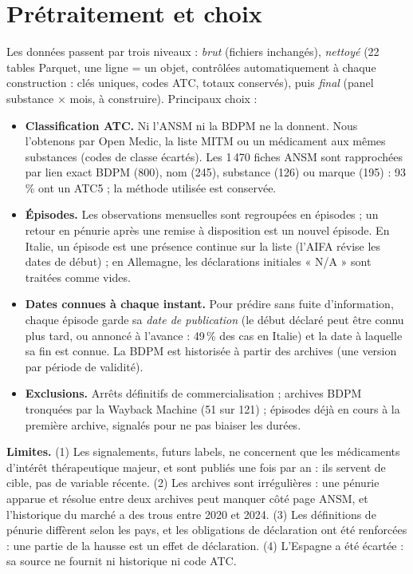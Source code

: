 \documentclass[10pt,a4paper]{article}
\newcommand{\nb}[1]{\textbf{#1}}
\begin{document}
\section{Prétraitement et choix}

Les données passent par trois niveaux : \emph{brut} (fichiers inchangés), \emph{nettoyé} (22 tables Parquet, une ligne =
un objet, contrôlées automatiquement à chaque construction : clés uniques, codes ATC, totaux conservés), puis \emph{final}
(panel substance × mois, à construire). Principaux choix :

\begin{itemize}
  \item \nb{Classification ATC.} Ni l'ANSM ni la BDPM ne la donnent. Nous l'obtenons par Open Medic, la liste MITM ou un
  médicament aux mêmes substances (codes de classe écartés). Les 1\,470 fiches ANSM sont rapprochées par lien exact BDPM (800),
  nom (245), substance (126) ou marque (195) : 93\,\% ont un ATC5 ; la méthode utilisée est conservée.
  \item \nb{Épisodes.} Les observations mensuelles sont regroupées en épisodes ; un retour en pénurie après une remise à
  disposition est un nouvel épisode. En Italie, un épisode est une présence continue sur la liste (l'AIFA révise les dates de
  début) ; en Allemagne, les déclarations initiales « N/A » sont traitées comme vides.
  \item \nb{Dates connues à chaque instant.} Pour prédire sans fuite d'information, chaque épisode garde sa \emph{date de
  publication} (le début déclaré peut être connu plus tard, ou annoncé à l'avance : 49\,\% des cas en Italie) et la date à
  laquelle sa fin est connue. La BDPM est historisée à partir des archives (une version par période de validité).
  \item \nb{Exclusions.} Arrêts définitifs de commercialisation ; archives BDPM tronquées par la Wayback Machine (51 sur 121) ;
  épisodes déjà en cours à la première archive, signalés pour ne pas biaiser les durées.
\end{itemize}

\textbf{Limites.} (1) Les signalements, futurs labels, ne concernent que les médicaments d'intérêt thérapeutique majeur, et sont
publiés une fois par an : ils servent de cible, pas de variable récente. (2) Les archives sont irrégulières : une pénurie
apparue et résolue entre deux archives peut manquer côté page ANSM, et l'historique du marché a des trous entre 2020 et 2024.
(3) Les définitions de pénurie diffèrent selon les pays, et les obligations de déclaration ont été renforcées : une partie de
la hausse est un effet de déclaration. (4) L'Espagne a été écartée : sa source ne fournit ni historique ni code ATC.
\end{document}
